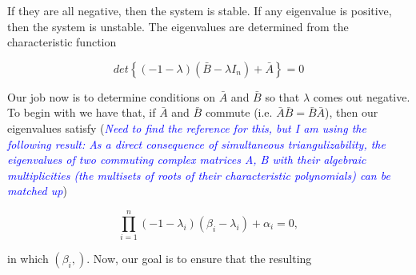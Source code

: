 \documentclass[preprint,12pt]{article}
\theoremstyle{definition}
\theoremstyle{theorem}
\theoremstyle{remark}
\theoremstyle{example}
\newcommand{\ah}[1]{\textcolor{blue}{\textit{#1}}}
\begin{document}
	If they are all negative, then the system is stable. If any eigenvalue is positive, then the system is unstable. The eigenvalues are determined from the characteristic function
	
	\begin{equation}
		det \left\{ (-1 - \lambda)(\bar{B} - \lambda I_n) + \bar{A} \right\} = 0
	\end{equation}

	Our job now is to determine conditions on $\bar{A}$ and $\bar{B}$ so that $\lambda$ comes out negative. To begin with we have that, if $\bar{A}$ and $\bar{B}$ commute (i.e. $\bar{A}\bar{B} = \bar{B}\bar{A}$), then our eigenvalues satisfy (\ah{Need to find the reference for this, but I am using the following result: As a direct consequence of simultaneous triangulizability, the eigenvalues of two commuting complex matrices A, B with their algebraic multiplicities (the multisets of roots of their characteristic polynomials) can be matched up})
		
	\begin{equation}
		\prod_{i = 1}^{n} (-1 - \lambda_i) (\beta_i - \lambda_i) + \alpha_i = 0, 
	\end{equation}

	in which $(\beta_i,  )$. Now, our goal is to ensure that the resulting 
\end{document}
